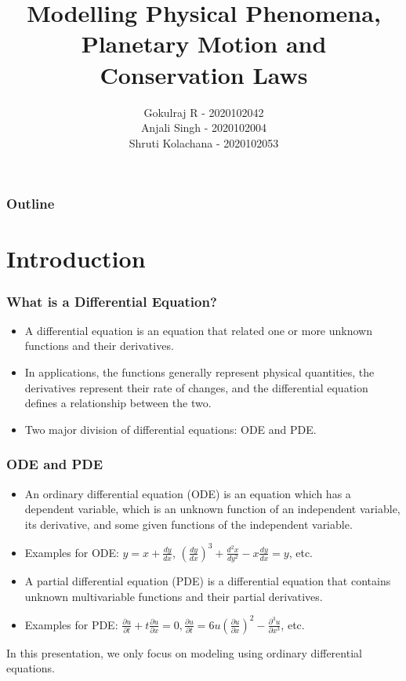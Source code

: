 \documentclass[10pt]{beamer}
\title{Modelling Physical Phenomena, Planetary Motion and Conservation Laws}
\author{Gokulraj R - 2020102042 \\
Anjali Singh - 2020102004\\
Shruti Kolachana - 2020102053
}
\begin{document}
\maketitle

\begin{frame}
    \frametitle{Outline}
    \tableofcontents
\end{frame}

\section{Introduction}

\begin{frame}
    \frametitle{What is a Differential Equation?}
    \begin{itemize}
        \item A differential equation is an equation that related one or more unknown functions and their derivatives.
        \item In applications, the functions generally represent physical quantities, the derivatives represent their rate of changes, and the differential equation defines a relationship between the two.
        \item Two major division of differential equations: ODE and PDE.
    \end{itemize}
\end{frame}

\begin{frame}
    \frametitle{ODE and PDE}
    \begin{itemize}
        \item An ordinary differential equation (ODE) is an equation which has a dependent variable, which is an unknown function of an independent variable, its derivative, and some given functions of the independent variable.
        \item Examples for ODE: $y = x + \frac{dy}{dx}$, $(\frac{dy}{dx})^3 + \frac{d^2 x}{dy^2} - x \frac{dy}{dx} = y$, etc.
        \item A partial differential equation (PDE) is a differential equation that contains unknown multivariable functions and their partial derivatives.
        \item Examples for PDE: $\frac{\partial u}{\partial t} + t \frac{\partial u}{\partial x} = 0, \frac{\partial u}{\partial t} = 6u (\frac{\partial u}{\partial x})^2 - \frac{\partial ^3 u}{\partial x^3}$, etc.
    \end{itemize}

    \bigskip

    In this presentation, we only focus on modeling using ordinary differential equations.
\end{frame}
\end{document}
